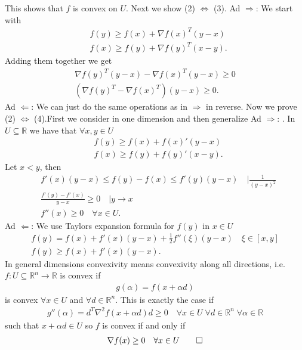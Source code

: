 This shows that $f$ is convex on $U$.
\newline
Next we show (2) $\Leftrightarrow$ (3).\newline
Ad $\Rightarrow$:  We start with
\begin{align}
    &f(y) \ge f(x) + \nabla f(x)^{T}(y-x)\\
    &f(x) \ge f(y) + \nabla f(y)^{T}(x-y).
\end{align}
Adding them together we get
\begin{align}
    \nabla f(y)^{T}(y-x) - \nabla f(x)^{T}(y-x) \ge 0\\
    \left( \nabla f(y)^{T} - \nabla f(x)^{T} \right) (y-x) \ge 0.
\end{align}
Ad $\Leftarrow$: We can just do the same operations as in $\Rightarrow$ in
reverse.
\newline
Now we prove (2) $\Leftrightarrow$ (4).First we consider in one dimension and
then generalize
\newline
Ad $\Rightarrow$: . In
$U \subseteq \mathbb{R}$ we have that $\forall x ,y \in U$
\begin{align}
    &f(y) \ge f(x) + f(x)'(y-x)\\
    &f(x) \ge f(y) + f(y)'(x-y).
\end{align}
Let $x < y$, then
\begin{align}
   &f'(x)(y-x) \le f(y) - f(x) \le f'(y) (y- x) \quad | \frac{1}{(y-x)^{2}}\\
   &\frac{f'(y) - f'(x)}{y-x} \ge 0 \quad | y\to x\\
   &f''(x) \ge 0 \quad \forall x \in U.
\end{align}
Ad $\Leftarrow$: We use Taylors expansion formula for $f(y)$ in $x \in U$
\begin{align}
    f(y) = f(x) + f'(x)(y-x) + \frac{1}{2}f''(\xi) (y-x)\quad \xi \in [x,y]\\
    f(y) \ge f(x) + f'(x)(y-x).
\end{align}
In general dimensions convexivity means convexivity along all directions,
i.e. $f : U\subseteq \mathbb{R}^{n} \to \mathbb{R}$ is convex if
\begin{align}
    g(\alpha) = f(x + \alpha d)
\end{align}
is convex $\forall x \in U$ and $\forall d \in \mathbb{R}^{n}$. This is
exactly the case if
\begin{align}
    g''(\alpha) = d^{T}\nabla^{2}f(x+\alpha d) d \ge 0 \quad \forall x \in
    U\; \forall d \in \mathbb{R}^{n} \; \forall \alpha \in \mathbb{R}
\end{align}
such that $x + \alpha d \in U$ so $f$ is convex if and only if
\begin{align}
    \nabla f(x) \ge 0 \quad \forall x \in U \qed
\end{align}
